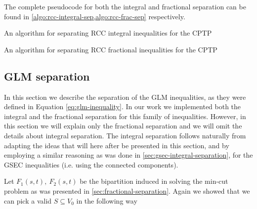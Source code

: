 The complete pseudocode for both the integral and fractional separation can be found in \cref{algo:rcc-integral-sep,algo:rcc-frac-sep} respectively.

\begin{algorithm}
	\caption{An algorithm for separating RCC integral inequalities for the CPTP}
	\label{algo:rcc-integral-sep}
	
\end{algorithm}

\begin{algorithm}
	\caption{An algorithm for separating RCC fractional inequalities for the CPTP}
	\label{algo:rcc-frac-sep}
	
\end{algorithm}

\subsection{GLM separation}
\label{sec:impl-glm-separation}

In this section we describe the separation of the GLM inequalities, as they were defined in Equation \eqref{eq:glm-inequality}.
In our work we implemented both the integral and the fractional separation for this family of inequalities.
However, in this section we will explain only the fractional separation and we will omit the details about integral separation.
The integral separation follows naturally from adapting the ideas that will here after be presented in this section, and by employing a similar reasoning as was done in \cref{sec:gsec-integral-separation}, for the GSEC inequalities (i.e. using the connected components).

Let $F_1(s, t),\ F_2(s, t)$ be the bipartition induced in solving the min-cut problem as was presented in \cref{sec:fractional-separation}.
Again we showed that we can pick a valid $S \subseteq V_0$ in the following way

